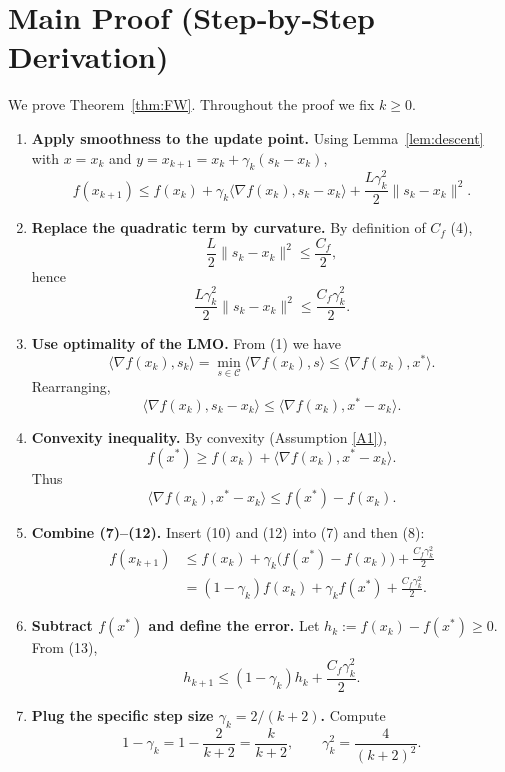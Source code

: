 \documentclass[11pt]{article}
\newcommand{\Cset}{\mathcal{C}}
\begin{document}
\section*{Main Proof (Step‑by‑Step Derivation)}
We prove Theorem~\ref{thm:FW}. Throughout the proof we fix $k\ge0$.

\begin{enumerate}[label=[Step \arabic*], leftmargin=*]
\item \textbf{Apply smoothness to the update point.}  
Using Lemma~\ref{lem:descent} with $x=x_{k}$ and $y=x_{k+1}=x_{k}+\gamma_{k}(s_{k}-x_{k})$,
\[
f(x_{k+1})\le f(x_{k})+\gamma_{k}\langle\nabla f(x_{k}),s_{k}-x_{k}\rangle
+\frac{L\gamma_{k}^{2}}{2}\|s_{k}-x_{k}\|^{2}.
\tag{7}
\]

\item \textbf{Replace the quadratic term by curvature.}  
By definition of $C_{f}$ (4),
\[
\frac{L}{2}\|s_{k}-x_{k}\|^{2}\le \frac{C_{f}}{2},
\]
hence
\[
\frac{L\gamma_{k}^{2}}{2}\|s_{k}-x_{k}\|^{2}\le \frac{C_{f}\gamma_{k}^{2}}{2}.
\tag{8}
\]

\item \textbf{Use optimality of the LMO.}  
From (1) we have
\[
\langle\nabla f(x_{k}),s_{k}\rangle
= \min_{s\in\Cset}\langle\nabla f(x_{k}),s\rangle
\le \langle\nabla f(x_{k}),x^{*}\rangle .
\tag{9}
\]
Rearranging,
\[
\langle\nabla f(x_{k}),s_{k}-x_{k}\rangle
\le \langle\nabla f(x_{k}),x^{*}-x_{k}\rangle .
\tag{10}
\]

\item \textbf{Convexity inequality.}  
By convexity (Assumption \ref{A1}),
\[
f(x^{*})\ge f(x_{k})+\langle\nabla f(x_{k}),x^{*}-x_{k}\rangle .
\tag{11}
\]
Thus
\[
\langle\nabla f(x_{k}),x^{*}-x_{k}\rangle\le f(x^{*})-f(x_{k}).
\tag{12}
\]

\item \textbf{Combine (7)–(12).}  
Insert (10) and (12) into (7) and then (8):
\[
\begin{aligned}
f(x_{k+1})
&\le f(x_{k})+\gamma_{k}\bigl(f(x^{*})-f(x_{k})\bigr)
+\frac{C_{f}\gamma_{k}^{2}}{2}\\[4pt]
&= (1-\gamma_{k})f(x_{k})+\gamma_{k}f(x^{*})+\frac{C_{f}\gamma_{k}^{2}}{2}.
\end{aligned}
\tag{13}
\]

\item \textbf{Subtract $f(x^{*})$ and define the error.}  
Let $h_{k}:=f(x_{k})-f(x^{*})\ge0$.  From (13),
\[
h_{k+1}\le (1-\gamma_{k})h_{k}+ \frac{C_{f}\gamma_{k}^{2}}{2}.
\tag{14}
\]

\item \textbf{Plug the specific step size $\gamma_{k}=2/(k+2)$.}  
Compute
\[
1-\gamma_{k}=1-\frac{2}{k+2}= \frac{k}{k+2},\qquad
\gamma_{k}^{2}= \frac{4}{(k+2)^{2}}.
\tag{15}
\]


\end{enumerate}
\end{document}
